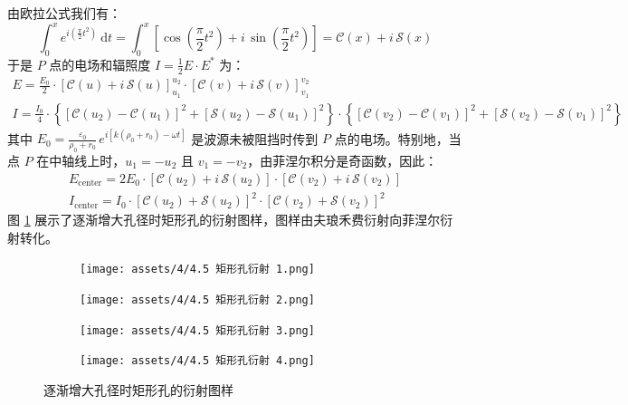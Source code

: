 \documentclass[UTF8]{report}
\theoremstyle{MyLineTheoremStyle} %
\theoremstyle{MyBlockTheoremStyle} %
\theoremstyle{MySubsubsectionStyle} %
\begin{document}
由欧拉公式我们有：
\begin{equation}
\int_{0}^{x} e^{i\left(\frac{\pi}{2}t^2\right)} \ \mathrm{d}t = 
\int_{0}^{x} \left[ \cos \left(\frac{\pi}{2}t^2\right) + i\, \sin \left(\frac{\pi}{2}t^2\right) \right] = \mathscr{C}(x) + i\, \mathscr{S}(x)
\end{equation}
于是 $P$ 点的电场和辐照度 $I = \frac{1}{2} E\cdot E^*$ 为：
\begin{gather}
E 
= \frac{E_0}{2} \cdot  \left[\mathscr{C}(u) + i\, \mathscr{S}(u) \right]_{u_1}^{u_2} \cdot \left[\mathscr{C}(v) + i\, \mathscr{S}(v) \right]_{v_1}^{v_2} 
\\ 
I  = \frac{I_0}{4} \cdot  \left\{ \left[\mathscr{C}(u_2) - \mathscr{C}(u_1)\right]^2 + \left[\mathscr{S}(u_2) - \mathscr{S}(u_1)\right]^2 \right\} \cdot \left\{ \left[\mathscr{C}(v_2) - \mathscr{C}(v_1)\right]^2 + \left[\mathscr{S}(v_2) - \mathscr{S}(v_1)\right]^2 \right\}
\end{gather}
其中 $E_0 = \frac{\varepsilon_0}{\rho_0 + r_0}\,e^{i\left[k(\rho_0 + r_0) - \omega t\right]}$ 是波源未被阻挡时传到 $P$ 点的电场。特别地，当点 $P$ 在中轴线上时，$u_1 = -u_2$ 且 $v_1 = -v_2$，由菲涅尔积分是奇函数，因此：
\begin{gather}
E_{\text{center}} =  2 E_0 \cdot \left[\mathscr{C}(u_2) + i\, \mathscr{S}(u_2) \right]  \cdot \left[\mathscr{C}(v_2) + i\, \mathscr{S}(v_2) \right] 
\\ 
I_{\text{center}} = I_0 \cdot \left[\mathscr{C}(u_2) + \mathscr{S}(u_2) \right]^2  \cdot \left[\mathscr{C}(v_2) + \mathscr{S}(v_2) \right]^2
\end{gather}
图 \ref{逐渐增大孔径时矩形孔的衍射图样} 展示了逐渐增大孔径时矩形孔的衍射图样，图样由夫琅禾费衍射向菲涅尔衍射转化。
\begin{figure}[H]\centering
\begin{subfigure}[b]{0.66\columnwidth}\centering
    \texttt{[image: assets/4/4.5 矩形孔衍射 1.png]}
\end{subfigure}\hfill
\begin{subfigure}[b]{0.315\columnwidth}\centering
    \texttt{[image: assets/4/4.5 矩形孔衍射 2.png]}
\end{subfigure}
\begin{subfigure}[b]{0.66\columnwidth}\centering
    \texttt{[image: assets/4/4.5 矩形孔衍射 3.png]}
\end{subfigure}\hfill
\begin{subfigure}[b]{0.315\columnwidth}\centering
    \texttt{[image: assets/4/4.5 矩形孔衍射 4.png]}
\end{subfigure}
\caption{逐渐增大孔径时矩形孔的衍射图样}
\label{逐渐增大孔径时矩形孔的衍射图样}
\end{figure}
\end{document}
